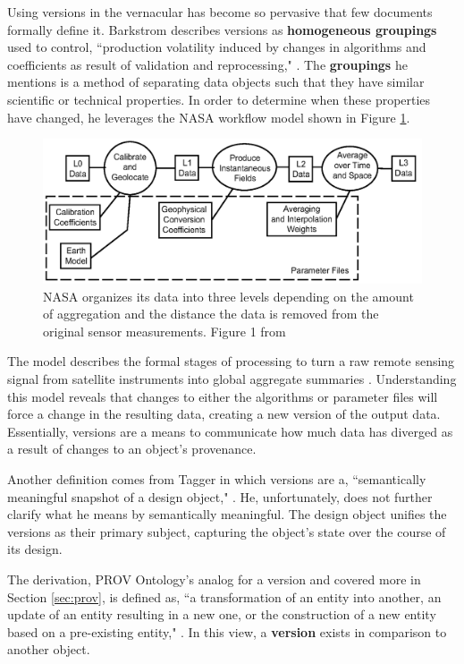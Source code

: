 Using versions in the vernacular has become so pervasive that few documents formally define it.
Barkstrom describes versions as \textbf{homogeneous groupings} used to control, ``production volatility induced by changes in algorithms and coefficients as result of validation and reprocessing," \cite{Barkstrom2003}.
The \textbf{groupings} he mentions is a method of separating data objects such that they have similar scientific or technical properties.
In order to determine when these properties have changed, he leverages the NASA workflow model shown in Figure \ref{NASALevels}.
\begin{figure}
	\centering
	\includegraphics[scale=0.35]{figures/NASALevels.png}
	\caption[NASA organizes its data into three levels depending on the amount of aggregation and the distance the data is removed from the original sensor measurements.]{NASA organizes its data into three levels depending on the amount of aggregation and the distance the data is removed from the original sensor measurements. Figure 1 from \cite{Barkstrom2003}}
	\label{NASALevels}
\end{figure}
The model describes the formal stages of processing to turn a raw remote sensing signal from satellite instruments into global aggregate summaries \cite{Barkstrom2003}.
Understanding this model reveals that changes to either the algorithms or parameter files will force a change in the resulting data, creating a new version of the output data.
Essentially, versions are a means to communicate how much data has diverged as a result of changes to an object's provenance.

Another definition comes from Tagger in which versions are a, ``semantically meaningful snapshot of a design object," \cite{Tagger2005}.
He, unfortunately, does not further clarify what he means by semantically meaningful.
The design object unifies the versions as their primary subject, capturing the object's state over the course of its design.

The derivation, PROV Ontology's analog for a version and covered more in Section \ref{sec:prov}, is defined as, ``a transformation of an entity into another, an update of an entity resulting in a new one, or the construction of a new entity based on a pre-existing entity," \cite{Lebo2013}.
In this view, a \textbf{version} exists in comparison to another object.

